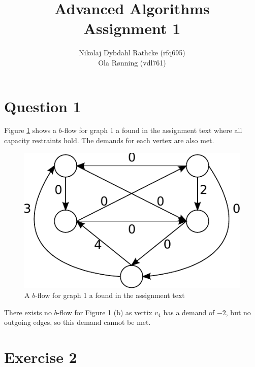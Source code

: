 \documentclass[a4paper]{article}
\author{Nikolaj Dybdahl Rathcke (rfq695) \\ Ola Rønning (vdl761)}
\title{Advanced Algorithms \\ Assignment 1}
\begin{document}
\maketitle
\section*{Question 1}
Figure \ref{fig:ex1figa} shows a $b$-flow for graph 1 a found in the assignment text where all capacity restraints hold. The demands for each vertex are also met.
\begin{figure}[H]
\centering
\includegraphics[width=\textwidth/2]{graphics/fig1.pdf}
\caption{A $b$-flow for graph 1 a found in the assignment text}
\label{fig:ex1figa}
\end{figure}
There exists no $b$-flow for Figure 1 (b) as vertix $v_4$ has a demand of $-2$, but no outgoing edges, so this demand cannot be met.

\newpage
\section*{Exercise 2}
\end{document}
